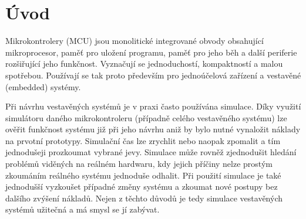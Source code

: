 % 
% 

\chapter{Úvod}

Mikrokontrolery (MCU) jsou monolitické integrované obvody obsahující mikroprocesor, paměť pro uložení programu, paměť pro jeho běh a další periferie
rozšiřující jeho funkčnost. Vyznačují se jednoduchostí, kompaktností a malou spotřebou. Používají se tak proto především pro jednoúčelová zařízení a 
vestavěné (embedded) systémy.

Při návrhu vestavěných systémů je v praxi často používána simulace. Díky využití simulátoru daného mikrokontroleru (případně celého vestavěného systému) lze ověřit funkčnost systému již při jeho návrhu aniž by bylo nutné vynaložit náklady na prvotní prototypy. Simulační čas lze zrychlit nebo naopak zpomalit a tím jednodušeji prozkoumat vybrané jevy. Simulace může rovněž zjednodušit hledání problémů viděných na reálném hardwaru, kdy jejich příčiny nelze prostým zkoumáním reálného systému jednoduše odhalit. Při použití simulace je také jednodušší vyzkoušet případné změny systému a zkoumat nové postupy bez dalšího zvýšení nákladů. Nejen z těchto důvodů je tedy simulace vestavěných systémů užitečná a má smysl se jí zabývat.

